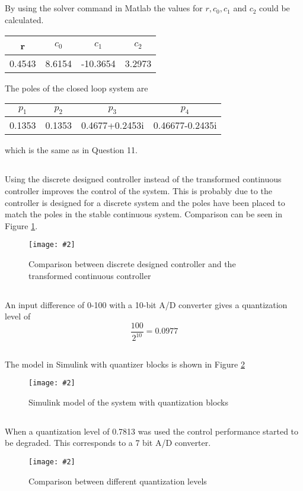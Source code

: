 \documentclass[12pt,a4paper]{article}
\newcommand{\fig}[4]{
    \begin{figure}[!h]
      \centering
      \texttt{[image: \#2]}
        \label{fig:#3}
        \caption{#4}
    \end{figure}
}
\begin{document}
\subsection{}%
By using the solver command in Matlab the values for $r, c_0, c_1$ and $c_2$ could be calculated.

\begin{center}
	\begin{tabular}{| c | c | c | c |}
	\hline
	r & $c_0$ & $c_1$ & $c_2$ \\
	\hline
	0.4543 & 8.6154 & -10.3654 & 3.2973 \\
	\hline
	\end{tabular}
\end{center}

The poles of the closed loop system are
\begin{center}
	\begin{tabular}{| c | c | c | c |}
	\hline
	$p_1$ & $p_2$ & $p_3$ & $p_4$ \\
	\hline
	0.1353 & 0.1353 & 0.4677+0.2453i & 0.46677-0.2435i\\
	\hline
	\end{tabular}
\end{center}
which is the same as in Question 11.

\subsection{}%
Using the discrete designed controller instead of the transformed continuous controller improves the control of the system. This is probably due to the controller is designed for a discrete system and the poles have been placed to match the poles in the stable continuous system. Comparison can be seen in Figure \ref{fig:ex17}.

\fig{0.6}{ex17.png}{ex17}{Comparison between discrete designed controller and the transformed continuous controller}

\subsection{}%
An input difference of 0-100 with a 10-bit A/D converter gives a quantization level of
\begin{equation}
	\frac{100}{2^{10}} = 0.0977
\end{equation}

\subsection{}%
The model in Simulink with quantizer blocks is shown in Figure \ref{fig:ex19}
\fig{0.8}{ex19.png}{ex19}{Simulink model of the system with quantization blocks}

\subsection{}%
When a quantization level of 0.7813 was used the control performance started to be degraded. This corresponds to a 7 bit A/D converter.

\fig{1}{ex20.png}{ex20}{Comparison between different quantization levels}
\end{document}
